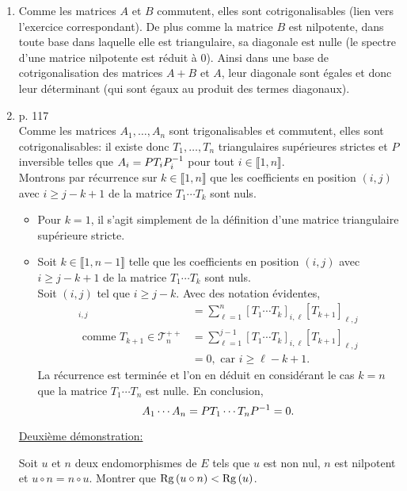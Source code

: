 \begin{solution}
    \begin{enumerate}
        \item Comme les matrices $A$ et $B$ commutent, elles sont cotrigonalisables (lien vers l'exercice correspondant). De plus comme la matrice $B$ est nilpotente, dans toute base dans laquelle elle est triangulaire, sa diagonale est nulle (le spectre d'une matrice nilpotente est réduit à $0$). Ainsi dans une base de cotrigonalisation des matrices $A+B$ et $A$, leur diagonale sont égales et donc leur déterminant (qui sont égaux au produit des termes diagonaux).
        \item \cite{reduc_des_endo} p. 117 \\
        Comme les matrices $A_1, \dots, A_n$ sont trigonalisables et commutent, elles sont cotrigonalisables: il existe donc $T_1, \dots, T_n$ triangulaires supérieures strictes et $P$ inversible telles que $A_i = P T_i P_i^{-1}$ pour tout $i \in \llbracket 1, n \rrbracket$. \\
        Montrons par récurrence sur $k \in \llbracket 1, n \rrbracket$ que les coefficients en position $(i, j)$ avec $i \geqslant j - k + 1$ de la matrice $T_1 \cdots T_k$ sont nuls. 
        \begin{itemize}
            \item Pour $k=1$, il s'agit simplement de la définition d'une matrice triangulaire supérieure stricte. 
            \item Soit $k \in \llbracket 1, n-1 \rrbracket$ telle que les coefficients en position $(i, j)$ avec $i \geqslant j - k + 1$ de la matrice $T_1 \cdots T_k$ sont nuls. \\
            Soit $(i, j)$ tel que $i \geqslant j - k$. Avec des notation évidentes, 
            \begin{align*}
                [T_1 \cdots T_{k+1}]_{i,j} &= \sum_{\ell=1}^n [T_1 \cdots T_k]_{i, \ell} [T_{k+1}]_{\ell, j} \\
                \text{ comme } T_{k+1} \in \mathscr{T}_n^{++} &= \sum_{\ell=1}^{j-1} [T_1 \cdots T_k]_{i, \ell} [T_{k+1}]_{\ell, j} \\
                &= 0, \text{ car } i \geqslant \ell - k +1.
            \end{align*}
            La récurrence est terminée et l'on en déduit en considérant le cas $k = n$ que la matrice $T_1 \cdots T_n$ est nulle. En conclusion,
            $$A_1 \cdots A_n = P T_1 \cdots T_n P^{-1} = 0.$$
        \end{itemize}
        \underline{Deuxième démonstration:} \\
        \begin{lemme}
            Soit $u$ et $n$ deux endomorphismes de $E$ tels que $u$ est non nul, $n$ est nilpotent et $u \circ n = n \circ u$. Montrer que $\mathrm{Rg}\,(u \circ n) < \mathrm{Rg}\,(u)$.
        \end{lemme}
        \begin{preuve}
            
        \end{preuve}
    \end{enumerate}
\end{solution}


